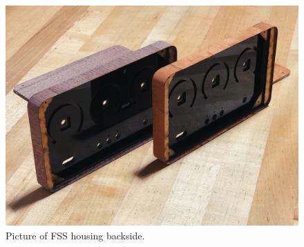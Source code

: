 \documentclass[conference]{IEEEtran}
\begin{document}
\begin{figure}[bhtp]
    \centering
    \includegraphics[width=5in]{./resources/figures/housing_v1_back.jpg}
    \caption{Picture of FSS housing backside.}
    \label{fig:fss_walnut_front}
\end{figure}
\end{document}

